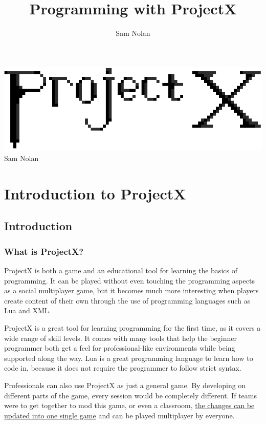 \documentclass{book}
\author{Sam Nolan}
\title{Programming with ProjectX}
\begin{document}
	\vspace*{\fill}
	\begin{center}
		\centering
		\includegraphics[width=\textwidth]{ProjectX.png}
		Sam Nolan
	\end{center}
	\vspace*{\fill}
	\tableofcontents

	\part{Introduction to ProjectX}

	\chapter{Introduction}
	\section{What is ProjectX?}
	ProjectX is both a game and an educational tool for learning the basics of programming. It can be played without even touching the programming aspects as a social multiplayer game, but it becomes much more interesting when players create content of their own through the use of programming languages such as Lua and XML.
	
	ProjectX is a great tool for learning programming for the first time, as it covers a wide range of skill levels. It comes with many tools that help the beginner programmer both get a feel for professional-like environments while being supported along the way. Lua is a great programming language to learn how to code in, because it does not require the programmer to follow strict syntax.
	
	Professionals can also use ProjectX as just a general game. By developing on different parts of the game, every session would be completely different. If teams were to get together to mod this game, or even a classroom, \underline{the changes can be updated into one single game} and can be played multiplayer by everyone. 
\end{document}
